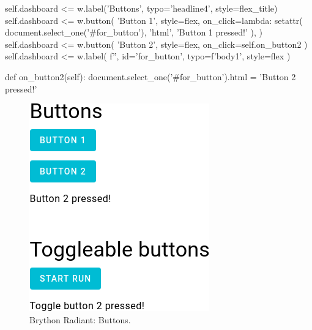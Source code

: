\begin{python}
    self.dashboard <= w.label('Buttons', typo='headline4', style=flex_title)
    self.dashboard <= w.button(
        'Button 1',
        style=flex,
        on_click=lambda: setattr(
            document.select_one('#for_button'), 'html', 'Button 1 pressed!'
        ),
    )
    self.dashboard <= w.button(
        'Button 2', style=flex, on_click=self.on_button2
    )
    self.dashboard <= w.label(
        f'', id='for_button', typo=f'body1', style=flex
    )

def on_button2(self):
    document.select_one('#for_button').html = 'Button 2 pressed!'
\end{python}


\begin{figure}[H]
\begin{centering}
\includegraphics[scale=0.5, left]{Cap4/Figures/widgets/buttons.png}
\par\end{centering}
\caption[Brython Radiant: Buttons]{Brython Radiant: Buttons.}
\label{fig:radiant_buttons}
\end{figure}